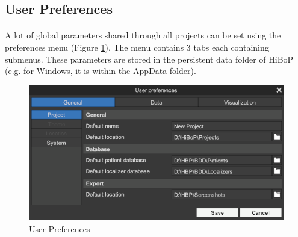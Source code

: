 \documentclass[a4paper]{article}
\begin{document}
\subsection{User Preferences}\label{preferences}
\paragraph{} A lot of global parameters shared through all projects can be set using the preferences menu (Figure \ref{preferencesUI}). The menu contains 3 tabs each containing submenus. These parameters are stored in the persistent data folder of HiBoP (e.g. for Windows, it is within the AppData folder).
\begin{figure}[H]
\begin{center}
\includegraphics[scale=0.5]{Preferences.png}
\end{center}
\caption{\label{preferencesUI}User Preferences}
\end{figure}
\end{document}
